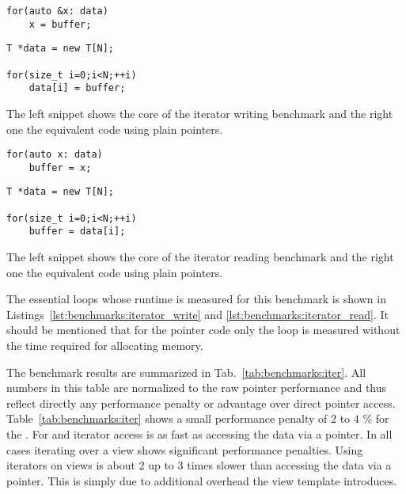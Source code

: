 \begin{listing}[tb]
\centering
\begin{minipage}[b]{0.4\linewidth}
\begin{verbatim}
for(auto &x: data) 
    x = buffer;
\end{verbatim} 
\end{minipage}
\hspace{0.1\linewidth}
\begin{minipage}[b]{0.4\linewidth}
\begin{verbatim}
T *data = new T[N];

for(size_t i=0;i<N;++i) 
    data[i] = buffer;
\end{verbatim}
\end{minipage}
\caption{\label{lst:benchmarks:iterator_write}
The left snippet shows the core of the iterator writing benchmark and the right
one the equivalent code using plain pointers.
}
\end{listing}

\begin{listing}[tb]
\centering
\begin{minipage}{0.4\linewidth}
\begin{verbatim}
for(auto x: data)
    buffer = x;
\end{verbatim}
\end{minipage}
\hspace{0.1\linewidth}
\begin{minipage}{0.4\linewidth}
\begin{verbatim}
T *data = new T[N];

for(size_t i=0;i<N;++i)
    buffer = data[i];
\end{verbatim}
\end{minipage}
\caption{\label{lst:benchmarks:iterator_read}
The left snippet shows the core of the iterator reading benchmark and the right
one the equivalent code using plain pointers.
}
\end{listing}

The essential loops whose runtime is measured for this benchmark is shown in
Listings~\ref{lst:benchmarks:iterator_write} and
\ref{lst:benchmarks:iterator_read}. It should be mentioned that for the pointer
code only the loop is measured without the time required for allocating memory.

The benchmark results are summarized in Tab.~\ref{tab:benchmarks:iter}. All
numbers in this table are normalized to the raw pointer performance and thus
reflect directly any performance penalty or advantage over direct pointer
access. Table~\ref{tab:benchmarks:iter} shows a small performance penalty
of $2$ to $4$ \% for  the . For  
and  iterator access is as fast as accessing the data 
via a pointer. 
In all cases iterating over a view shows significant performance penalties. 
Using iterators on views is about $2$ up to $3$ times slower than accessing 
the data via a pointer. This is simply due to additional overhead the 
view template introduces. 


